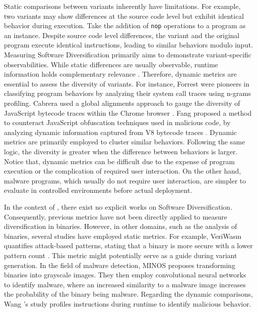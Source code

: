 \begin{strategy}
    \label{trace_based}
    Static comparisons between variants inherently have limitations. 
    For example, two variants may show differences at the source code level but exhibit identical behavior during execution. 
    Take the addition of \texttt{nop} operations to a program as an instance. 
    Despite source code level differences, the variant and the original program execute identical instructions, leading to similar behaviors modulo input. 
    Measuring Software Diversification primarily aims to demonstrate variant-specific observabilities. 
    While static differences are usually observable, runtime information holds complementary relevance \cite{yao2018anomaly}. 
    Therefore, dynamic metrics are essential to assess the diversity of variants. 
    For instance, Forrest \etal \cite{forrest_system_call} were pioneers in classifying program behaviors by analyzing their system call traces using n-grams profiling. 
    Cabrera \etal used a global alignments approach to gauge the diversity of JavaScript bytecode traces within the Chrome browser \cite{STRAC}. 
    Fang \etal proposed a method to counteract JavaScript obfuscation techniques used in malicious code, by analyzing dynamic information captured from V8 bytecode traces \cite{8482113}. 
    Dynamic metrics are primarily employed to cluster similar behaviors.
    Following the same logic, the diversity is greater when the difference between behaviors is larger. 
    Notice that, dynamic metrics can be difficult due to the expense of program execution or the complication of required user interaction. 
    On the other hand, malware programs, which usually do not require user interaction, are simpler to evaluate in controlled environments before actual deployment.

\end{strategy}

In the context of \Wasm, there exist no explicit works on Software Diversification.
Consequently, previous metrics have not been directly applied to measure diversification in \Wasm binaries.
However, in other domains, such as the analysis of \Wasm binaries, several studies have employed static metrics.
For example, VeriWasm quantifies attack-based patterns, stating that a \Wasm binary is more secure with a lower pattern count \cite{veriwasm}.
This metric might potentially serve as a guide during variant generation.
In the field of malware detection, MINOS \cite{MINOS} proposes transforming \Wasm binaries into grayscale images.
They then employ convolutional neural networks to identify malware, where an increased similarity to a malware image increases the probability of the binary being malware.
Regarding the dynamic comparisons, Wang \etal's study \cite{SEISMIC} profiles \Wasm instructions during runtime to identify malicious behavior.


